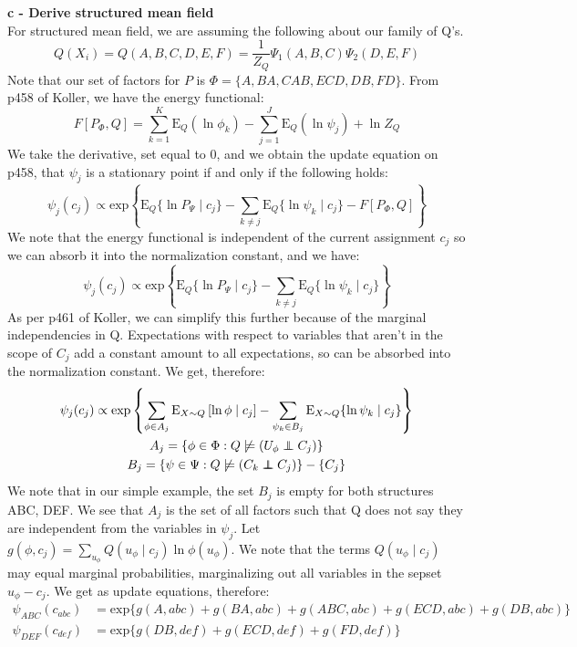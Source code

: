 \documentclass[12pt]{article}
\newcommand\independent{\protect\mathpalette{\protect\independenT}{\perp}}
\def\independenT#1#2{\mathrel{\rlap{$#1#2$}\mkern2mu{#1#2}}}
\begin{document}
\noindent \textbf{c - Derive structured mean field}\\
For structured mean field, we are assuming the following about our family of Q's.
\[
Q(X_i) = Q(A,B,C,D,E,F) = \frac{1}{Z_Q} \Psi_1 (A,B,C) \Psi_2 (D,E,F)
\]
Note that our set of factors for $P$ is $\Phi = \lbrace A, BA, CAB, ECD, DB, FD\rbrace$.  From p458 of Koller, we have the energy functional:
\[
F\left[P_\Phi, Q\right] = \sum\limits_{k = 1}^{K} \mathrm{E}_Q (\ln \phi_k) - \sum\limits_{j = 1}^{J} \mathrm{E}_Q ( \ln \psi_j ) + \ln Z_Q
\]
We take the derivative, set equal to 0, and we obtain the update equation on p458, that $\psi_j$ is a stationary point if and only if the following holds:
\[
\psi_j(c_j) \propto \mathrm{exp} \left\lbrace \mathrm{E}_Q \lbrace \ln P_\Psi \mid c_j \rbrace - \sum_{k \not = j} \mathrm{E}_Q \lbrace \ln \psi_k \mid c_j \rbrace - F\left[P_\Phi, Q\right] \right\rbrace
\]
We note that the energy functional is independent of the current assignment $c_j$ so we can absorb it into the normalization constant, and we have:
\[
\psi_j(c_j) \propto \mathrm{exp} \left\lbrace \mathrm{E}_Q \lbrace \ln P_\Psi \mid c_j \rbrace - \sum_{k \not = j} \mathrm{E}_Q \lbrace \ln \psi_k \mid c_j \rbrace \right\rbrace
\]
As per p461 of Koller, we can simplify this further because of the marginal independencies in Q.  Expectations with respect to variables that aren't in the scope of $C_j$ add a constant amount to all expectations, so can be absorbed into the normalization constant.  We get, therefore:
\begin{multline*}
\psi_j(c_j) \propto \mathrm{exp} \left\lbrace \sum_{\phi \in A_j} \mathrm{E}_{X \sim Q} \left[ \ln \phi \mid c_j \right] - \sum_{\psi_k \in B_j} \mathrm{E}_{X \sim Q} \lbrace \ln \psi_k \mid c_j \rbrace \right\rbrace \\
A_j = \lbrace \phi \in \Phi : Q \not \models (U_\phi \independent C_j)\rbrace \\ 
B_j = \lbrace \psi \in \Psi : Q \not \models (C_k \independent C_j)\rbrace - \lbrace
 C_j \rbrace \\
\end{multline*}
We note that in our simple example, the set $B_j$ is empty for both structures ABC, DEF.  We see that $A_j$ is the set of all factors such that Q does not say they are independent from the variables in $\psi_j$.  Let $ g(\phi, c_j) = \sum_{u_\phi} Q(u_\phi \mid c_j) \ln \phi(u_\phi)$.  We note that the terms $Q(u_\phi \mid c_j)$ may equal marginal probabilities, marginalizing out all variables in the sepset $u_\phi - c_j$.  We get as update equations, therefore:
\begin{align*}
\psi_{ABC}(c_{abc}) &= \mathrm{exp} \lbrace g(A, abc) + g(BA, abc) + g(ABC,abc) + g(ECD, abc) + g(DB,abc) \rbrace \\ 
\psi_{DEF}(c_{def}) &= \mathrm{exp} \lbrace g(DB, def) + g(ECD, def) + g(FD,def) \rbrace \\ 
\end{align*}
\end{document}
